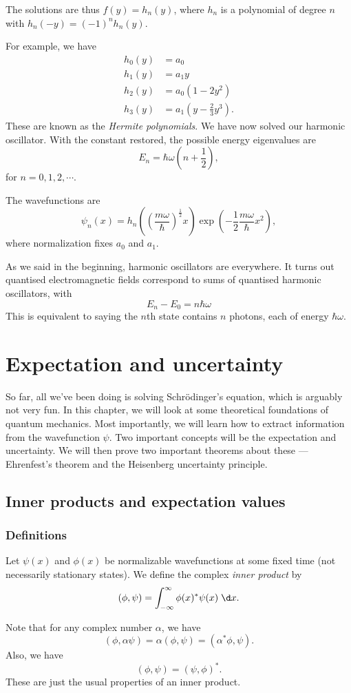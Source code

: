 \documentclass[a4paper]{article}
\begin{document}
The solutions are thus $f(y) = h_n(y)$, where $h_n$ is a polynomial of degree $n$ with $h_n(-y) = (-1)^n h_n(y)$.

For example, we have
\begin{align*}
  h_0(y) &= a_0\\
  h_1(y) &= a_1 y\\
  h_2(y) &= a_0(1 - 2y^2)\\
  h_3(y) &= a_1\left(y - \frac{2}{3}y^3\right).
\end{align*}
These are known as the \emph{Hermite polynomials}. We have now solved our harmonic oscillator. With the constant restored, the possible energy eigenvalues are
\[
  E_n = \hbar \omega \left(n + \frac{1}{2}\right),
\]
for $n = 0, 1, 2, \cdots$.

The wavefunctions are
\[
  \psi_n(x) = h_n \left(\left(\frac{m\omega}{\hbar}\right)^{\frac{1}{2}} x\right) \exp\left(-\frac{1}{2}\frac{m\omega}{\hbar} x^2\right),
\]
where normalization fixes $a_0$ and $a_1$.

As we said in the beginning, harmonic oscillators are everywhere. It turns out quantised electromagnetic fields correspond to sums of quantised harmonic oscillators, with
\[
  E_n - E_0 = n\hbar \omega
\]
This is equivalent to saying the $n$th state contains $n$ photons, each of energy $\hbar \omega$.

\section{Expectation and uncertainty}
So far, all we've been doing is solving Schr\"odinger's equation, which is arguably not very fun. In this chapter, we will look at some theoretical foundations of quantum mechanics. Most importantly, we will learn how to extract information from the wavefunction $\psi$. Two important concepts will be the expectation and uncertainty. We will then prove two important theorems about these --- Ehrenfest's theorem and the Heisenberg uncertainty principle.

\subsection{Inner products and expectation values}
\subsubsection*{Definitions}
\begin{defi}
  Let $\psi(x)$ and $\phi(x)$ be normalizable wavefunctions at some fixed time (not necessarily stationary states). We define the complex \emph{inner product} by
  \[
    (\phi, \psi) = \int_{-\infty}^\infty \phi(x)^* \psi (x)\;\d x.
  \]
\end{defi}
Note that for any complex number $\alpha$, we have
\[
  (\phi, \alpha \psi) = \alpha(\phi, \psi) = (\alpha^* \phi, \psi).
\]
Also, we have
\[
  (\phi, \psi) = (\psi, \phi)^*.
\]
These are just the usual properties of an inner product.
\end{document}

